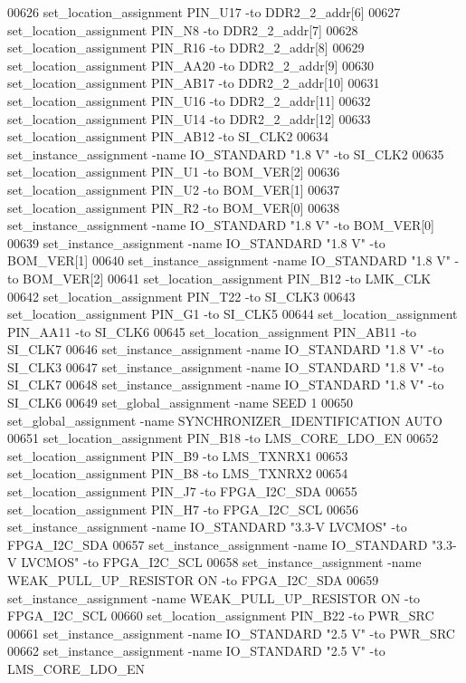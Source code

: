 \begin{DoxyCode}
00626 set\_location\_assignment PIN\_U17 -to DDR2\_2\_addr[6]
00627 set\_location\_assignment PIN\_N8 -to DDR2\_2\_addr[7]
00628 set\_location\_assignment PIN\_R16 -to DDR2\_2\_addr[8]
00629 set\_location\_assignment PIN\_AA20 -to DDR2\_2\_addr[9]
00630 set\_location\_assignment PIN\_AB17 -to DDR2\_2\_addr[10]
00631 set\_location\_assignment PIN\_U16 -to DDR2\_2\_addr[11]
00632 set\_location\_assignment PIN\_U14 -to DDR2\_2\_addr[12]
00633 set\_location\_assignment PIN\_AB12 -to SI\_CLK2
00634 set\_instance\_assignment -name IO\_STANDARD "1.\textcolor{vhdllogic}{8} V" -to SI\_CLK2
00635 set\_location\_assignment PIN\_U1 -to BOM\_VER[2]
00636 set\_location\_assignment PIN\_U2 -to BOM\_VER[1]
00637 set\_location\_assignment PIN\_R2 -to BOM\_VER[0]
00638 set\_instance\_assignment -name IO\_STANDARD "1.\textcolor{vhdllogic}{8} V" -to BOM\_VER[0]
00639 set\_instance\_assignment -name IO\_STANDARD "1.\textcolor{vhdllogic}{8} V" -to BOM\_VER[1]
00640 set\_instance\_assignment -name IO\_STANDARD "1.\textcolor{vhdllogic}{8} V" -to BOM\_VER[2]
00641 set\_location\_assignment PIN\_B12 -to LMK\_CLK
00642 set\_location\_assignment PIN\_T22 -to SI\_CLK3
00643 set\_location\_assignment PIN\_G1 -to SI\_CLK5
00644 set\_location\_assignment PIN\_AA11 -to SI\_CLK6
00645 set\_location\_assignment PIN\_AB11 -to SI\_CLK7
00646 set\_instance\_assignment -name IO\_STANDARD "1.\textcolor{vhdllogic}{8} V" -to SI\_CLK3
00647 set\_instance\_assignment -name IO\_STANDARD "1.\textcolor{vhdllogic}{8} V" -to SI\_CLK7
00648 set\_instance\_assignment -name IO\_STANDARD "1.\textcolor{vhdllogic}{8} V" -to SI\_CLK6
00649 set\_global\_assignment -name SEED \textcolor{vhdllogic}{1}
00650 set\_global\_assignment -name SYNCHRONIZER\_IDENTIFICATION AUTO
00651 set\_location\_assignment PIN\_B18 -to LMS\_CORE\_LDO\_EN
00652 set\_location\_assignment PIN\_B9 -to LMS\_TXNRX1
00653 set\_location\_assignment PIN\_B8 -to LMS\_TXNRX2
00654 set\_location\_assignment PIN\_J7 -to FPGA\_I2C\_SDA
00655 set\_location\_assignment PIN\_H7 -to FPGA\_I2C\_SCL
00656 set\_instance\_assignment -name IO\_STANDARD "3.3-V LVCMOS" -to FPGA\_I2C\_SDA
00657 set\_instance\_assignment -name IO\_STANDARD "3.3-V LVCMOS" -to FPGA\_I2C\_SCL
00658 set\_instance\_assignment -name WEAK\_PULL\_UP\_RESISTOR \textcolor{keywordflow}{ON} -to FPGA\_I2C\_SDA
00659 set\_instance\_assignment -name WEAK\_PULL\_UP\_RESISTOR \textcolor{keywordflow}{ON} -to FPGA\_I2C\_SCL
00660 set\_location\_assignment PIN\_B22 -to PWR\_SRC
00661 set\_instance\_assignment -name IO\_STANDARD "2.\textcolor{vhdllogic}{5} V" -to PWR\_SRC
00662 set\_instance\_assignment -name IO\_STANDARD "2.\textcolor{vhdllogic}{5} V" -to LMS\_CORE\_LDO\_EN

\end{DoxyCode}
